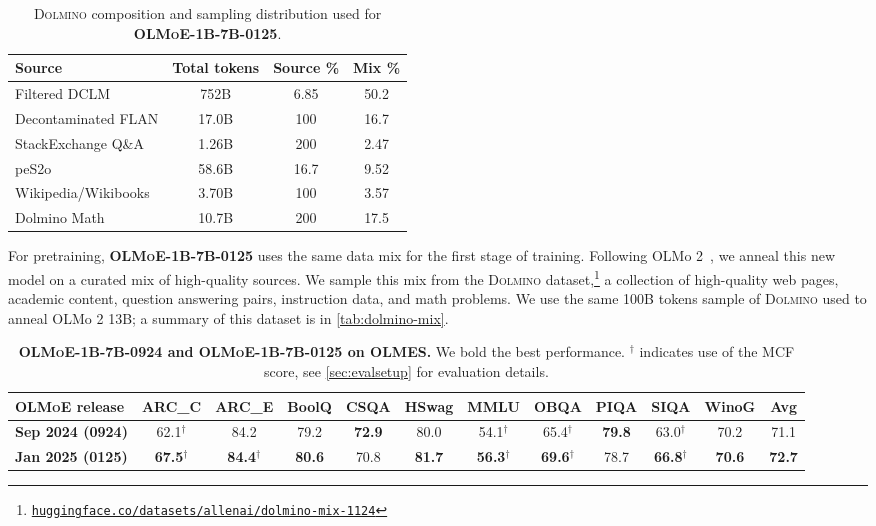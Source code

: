 \documentclass{article}
\newcommand{\modelsmallnew}{\textbf{\textsc{OLMoE-1B-7B-0125}}}
\newcommand{\modelsmalldate}{\textbf{\textsc{OLMoE-1B-7B-0924}}}
\begin{document}
\begin{table}[h]
\centering
\begin{tabular}{lccc}
\toprule
\textbf{Source} & \textbf{Total tokens} & \textbf{Source \%} & \textbf{Mix \%}\\
\midrule
Filtered DCLM & 752B & 6.85 & 50.2 \\
Decontaminated FLAN & 17.0B & 100 & 16.7 \\
StackExchange Q\&A & 1.26B & 200 & 2.47  \\
peS2o & 58.6B  & 16.7 & 9.52  \\
Wikipedia/Wikibooks & 3.70B & 100 & 3.57 \\
Dolmino Math & 10.7B & 200 & 17.5 \\
\bottomrule
\end{tabular}
\vspace{3pt}
\caption{\textsc{Dolmino} composition and sampling distribution used for \modelsmallnew{}.}
\label{tab:dolmino-mix}
\end{table}

For pretraining, \modelsmallnew{} uses the same data mix for the first stage of training. Following OLMo 2~\citep{OLMo2}, we anneal this new model on a curated mix of high-quality sources. 
We sample this mix from the \textsc{Dolmino} dataset,\footnote{\href{https://huggingface.co/datasets/allenai/dolmino-mix-1124}{\texttt{huggingface.co/datasets/allenai/dolmino-mix-1124}}} a collection of high-quality web pages, academic content, question answering pairs, instruction data, and math problems. We use the same 100B tokens sample of \textsc{Dolmino} used to anneal OLMo 2 13B; a summary of this dataset is in \autoref{tab:dolmino-mix}.

\begin{table}[htbp]
\setlength\tabcolsep{2pt} 
\centering
\begin{tabular}{l|ccccccccccc}
\toprule
\footnotesize{\bf{\textsc{OLMoE} release}} & \footnotesize{\bf{ARC\_C}} & \footnotesize{\bf{ARC\_E}} & \footnotesize{\bf{BoolQ}} & \footnotesize{\bf{CSQA}} & \footnotesize{\bf{HSwag}} & \footnotesize{\bf{MMLU}} & \footnotesize{\bf{OBQA}} & \footnotesize{\bf{PIQA}} & \footnotesize{\bf{SIQA}} & \footnotesize{\bf{WinoG}} & \footnotesize{\bf{Avg}}\\
\midrule
\textbf{Sep 2024 (0924)} & 62.1$^\dagger$ & 84.2 & 79.2 & \textbf{72.9} & 80.0 & 54.1$^\dagger$ & 65.4$^\dagger$ & \textbf{79.8} & 63.0$^\dagger$ & 70.2 & 71.1 \\
\textbf{Jan 2025 (0125)} & \textbf{67.5}$^\dagger$ & \textbf{84.4}$^\dagger$ & \textbf{80.6} & 70.8 & \textbf{81.7} & \textbf{56.3}$^\dagger$ & \textbf{69.6}$^\dagger$ & 78.7 & \textbf{66.8}$^\dagger$ & \textbf{70.6} & \textbf{72.7} \\
\bottomrule
\end{tabular}
\vspace{.5em}
\caption{\textbf{\modelsmalldate{} and \modelsmallnew{} on OLMES.}  We bold the best performance. $^\dagger$ indicates use of the MCF score, see \autoref{sec:evalsetup} for evaluation details.}
\label{tab:score-table-main-new}
\end{table}
\end{document}
